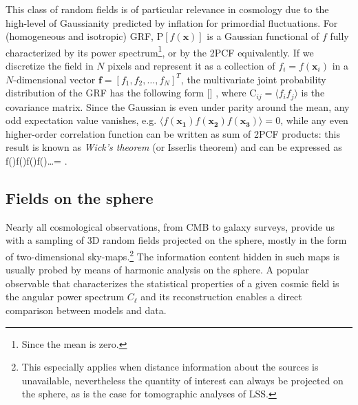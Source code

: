 This class of random fields is of particular relevance in cosmology due to the high-level of Gaussianity predicted by inflation for primordial fluctuations. For (homogeneous and isotropic) \gls{GRF}, $\text{P}[f(\bm{x})]$ is a Gaussian functional of $f$ fully characterized by its power spectrum\footnote{Since the mean is zero.}, or by the \gls{2PCF} equivalently. If we discretize the field in $N$ pixels and represent it  as a collection of $f_i=f(\bm{x}_i)$ in a $N$-dimensional vector $\bm{f}=[f_1,f_2,\dots,f_N]^T$, the multivariate joint probability distribution of the \gls{GRF}  has the following form
%
\be
{}[] \propto {},
\ee
%
where C$_{ij}=\langle f_i f_j\rangle$ is the covariance matrix. Since the Gaussian is even under parity around the mean, any odd expectation value vanishes, e.g. $\langle f(\bm{x_1})f(\bm{x_2})f(\bm{x_3})\rangle = 0$, while any even higher-order correlation function can be written as sum of \gls{2PCF} products: this result is known as \emph{Wick's theorem} (or Isserlis theorem) and can be expressed as 
%
\be
\langle f()f()f()f()\dots\rangle = \sum {}.
\ee
%

\subsection{Fields on the sphere}
\label{sec:harmanalysis}
Nearly all cosmological observations, from CMB to galaxy surveys, provide us with a sampling of 3D random fields projected on the sphere, mostly in the form of two-dimensional sky-maps.\footnote{This especially applies when distance information about the sources is unavailable, nevertheless the quantity of interest can always be projected on the sphere, as is the case for tomographic analyses of \gls{LSS}.}
The information content hidden in such maps is usually probed by means of harmonic analysis on the sphere. A popular observable that characterizes the statistical properties of a given cosmic field is the
angular power spectrum $C_{\ell}$ and its reconstruction enables a direct comparison between
models and data.

